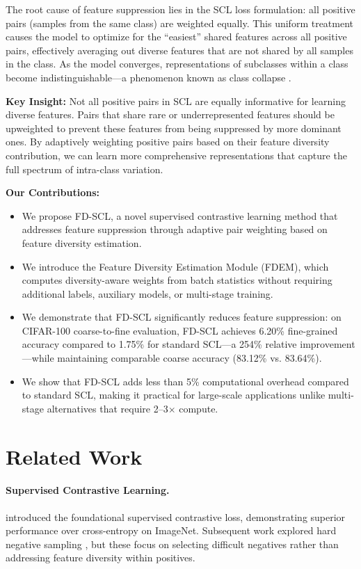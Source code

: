 \documentclass[11pt,a4paper]{article}
\begin{document}
The root cause of feature suppression lies in the SCL loss formulation: all positive pairs (samples from the same class) are weighted equally. This uniform treatment causes the model to optimize for the ``easiest'' shared features across all positive pairs, effectively averaging out diverse features that are not shared by all samples in the class. As the model converges, representations of subclasses within a class become indistinguishable---a phenomenon known as class collapse \citep{xue2023which}.

\textbf{Key Insight:} Not all positive pairs in SCL are equally informative for learning diverse features. Pairs that share rare or underrepresented features should be upweighted to prevent these features from being suppressed by more dominant ones. By adaptively weighting positive pairs based on their feature diversity contribution, we can learn more comprehensive representations that capture the full spectrum of intra-class variation.

\textbf{Our Contributions:}
\begin{itemize}
    \item We propose FD-SCL, a novel supervised contrastive learning method that addresses feature suppression through adaptive pair weighting based on feature diversity estimation.
    \item We introduce the Feature Diversity Estimation Module (FDEM), which computes diversity-aware weights from batch statistics without requiring additional labels, auxiliary models, or multi-stage training.
    \item We demonstrate that FD-SCL significantly reduces feature suppression: on CIFAR-100 coarse-to-fine evaluation, FD-SCL achieves 6.20\% fine-grained accuracy compared to 1.75\% for standard SCL---a 254\% relative improvement---while maintaining comparable coarse accuracy (83.12\% vs. 83.64\%).
    \item We show that FD-SCL adds less than 5\% computational overhead compared to standard SCL, making it practical for large-scale applications unlike multi-stage alternatives that require 2--3$\times$ compute.
\end{itemize}

\section{Related Work}

\paragraph{Supervised Contrastive Learning.}
\citet{khosla2020supervised} introduced the foundational supervised contrastive loss, demonstrating superior performance over cross-entropy on ImageNet. Subsequent work explored hard negative sampling \citep{robinson2021contrastive, jiang2024hardnegative}, but these focus on selecting difficult negatives rather than addressing feature diversity within positives.
\end{document}
